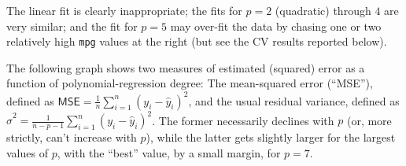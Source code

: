 \documentclass[
]{jss}
\begin{document}
The linear fit is clearly inappropriate; the fits for \(p = 2\)
(quadratic) through \(4\) are very similar; and the fit for \(p = 5\)
may over-fit the data by chasing one or two relatively high \texttt{mpg}
values at the right (but see the CV results reported below).

The following graph shows two measures of estimated (squared) error as a
function of polynomial-regression degree: The mean-squared error
(``MSE''), defined as
\(\mathsf{MSE} = \frac{1}{n}\sum_{i=1}^n (y_i - \widehat{y}_i)^2\), and
the usual residual variance, defined as
\(\widehat{\sigma}^2 = \frac{1}{n - p - 1} \sum_{i=1}^n (y_i - \widehat{y}_i)^2\).
The former necessarily declines with \(p\) (or, more strictly, can't
increase with \(p\)), while the latter gets slightly larger for the
largest values of \(p\), with the ``best'' value, by a small margin, for
\(p = 7\).
\end{document}
